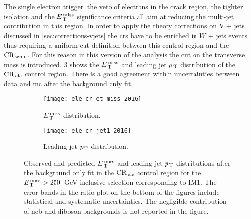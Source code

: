 The single electron trigger, the veto of electrons in the crack region, the
tighter isolation and the $E_\mathrm{\, T}^\mathrm{\, miss}$ significance criteria all aim at reducing the
multi-jet contribution in this region. In order to apply the theory corrections
on V + jets discussed in \cref{sec:corrections-vjets} the \glspl{cr} have to be
enriched in $W$ + jets events thus requiring a uniform cut definition between
this control region and the $\mathrm{CR}_\mathrm{\, wmn}$. For this reason in this version of the
analysis the cut on the transverse mass is
introduced.
\cref{fig:ele_cr_plots_2016}
shows the $E_\mathrm{\, T}^\mathrm{\, miss}$ and leading jet $p_\mathrm{\, T}$
distribution of the $\mathrm{CR}_\mathrm{\, ele}$ control region. There is a good agreement within
uncertainties between data and \gls{mc} after the background only fit.
\begin{figure}[!htb]
  \centering
  \begin{subfigure}[t]{.48\linewidth}
    \texttt{[image: ele\_cr\_et\_miss\_2016]}
    \caption{$E_\mathrm{\, T}^\mathrm{\, miss}$ distribution.}
    \label{fig:ele_cr_met}
  \end{subfigure}
  \begin{subfigure}[t]{.48\linewidth}
    \texttt{[image: ele\_cr\_jet1\_2016]}
    \caption{Leading jet $p_\mathrm{\, T}$ distribution.}
    \label{fig:ele_cr_jet1}
  \end{subfigure}
  \caption{Observed and predicted $E_\mathrm{\, T}^\mathrm{\, miss}$ and leading jet $p_\mathrm{\, T}$ distributions
    after the background only fit in the $\mathrm{CR}_\mathrm{\, ele}$ control region for the
    $E_\mathrm{\, T}^\mathrm{\, miss} > 250$~GeV inclusive selection corresponding to IM1. The error bands
    in the ratio plot on the bottom of the figures include statistical and
    systematic uncertainties. The negligible contribution of \gls{ncb} and
    diboson backgrounds is not reported in the figure.}
  \label{fig:ele_cr_plots_2016}
\end{figure}
